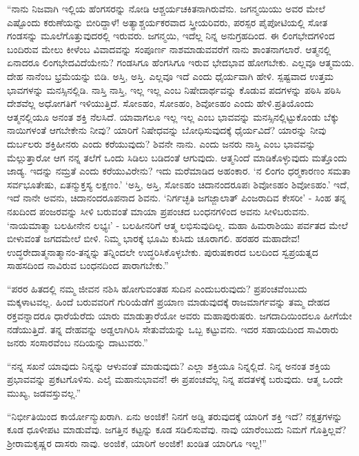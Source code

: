  “ನಾನು ನಿಜವಾಗಿ ಇಲ್ಲಿಯ ಹೆಂಗಸರನ್ನು ನೋಡಿ ಆಶ್ಚರ್ಯಚಕಿತನಾಗಿರುವೆನು. ಜಗನ್ಮಯಿಯು ಅವರ ಮೇಲೆ ಎಷ್ಟೊಂದು ಕರುಣೆಯನ್ನು ಬೀರಿದ್ದಾಳೆ! ಅತ್ಯಾಶ್ಚರ್ಯಕರವಾದ ಸ್ತ್ರೀಯರಿವರು, ಪರಸ್ಪರ ಪೈಪೋಟಿಯಲ್ಲಿ ಸೋತ ಗಂಡಸನ್ನು ಮೂಲೆಗೊತ್ತುವುದರಲ್ಲಿ ಇರುವರು. ಜಗನ್ಮಯಿ, ಇದೆಲ್ಲ ನಿನ್ನ ಅನುಗ್ರಹದಿಂದ. ಈ ಲಿಂಗಭೇದಗಳಿಂದ ಬಂದಿರುವ ಮೇಲು ಕೀಳೆಂಬ ವಿವಾದವನ್ನು ಸಂಪೂರ್ಣ ನಾಶಮಾಡುವವರೆಗೆ ನಾನು ಶಾಂತನಾಗಲಾರೆ. ಆತ್ಮನಲ್ಲಿ ಏನಾದರೂ‌ ಲಿಂಗಭೇದವಿದೆಯೇನು? ಗಂಡಸಿಗೂ ಹೆಂಗಸಿಗೂ ಇರುವ ಭೇದಭಾವ ಹೋಗಬೇಕು. ಎಲ್ಲವೂ ಆತ್ಮಮಯ. ದೇಹ ನಾನೆಂಬ ಭ್ರಮೆಯನ್ನು ಬಿಡಿ. ಅಸ್ತಿ, ಅಸ್ತಿ. ಎಲ್ಲವೂ ಇದೆ ಎಂದು ಧೈರ್ಯವಾಗಿ ಹೇಳಿ. ಸ್ಪಷ್ಟವಾದ ಉತ್ತಮ ಭಾವಗಳನ್ನು ಮನಸ್ಸಿನಲ್ಲಿಡಿ. ನಾಸ್ತಿ ನಾಸ್ತಿ, ಇಲ್ಲ ಇಲ್ಲ ಎಂಬ ನಿಷೇದಾರ್ಥವನ್ನು ಕೊಡುವ ಪದಗಳನ್ನು ಪಠಿಸಿ ಪಠಿಸಿ ದೇಶವೆಲ್ಲ ಅಧೋಗತಿಗೆ ಇಳಿಯುತ್ತಿದೆ. ಸೋಽಹಂ, ಸೋಽಹಂ, ಶಿವೋಽಹಂ ಎಂದು ಹೇಳಿ.\break ಪ್ರತಿಯೊಂದು ಆತ್ಮನಲ್ಲಿಯೂ ಅನಂತ ಶಕ್ತಿ ನೆಲಸಿದೆ. ಯಾವಾಗಲೂ ಇಲ್ಲ ಇಲ್ಲ ಎಂಬ ಭಾವವನ್ನು ಮನಸ್ಸಿನಲ್ಲಿಟ್ಟುಕೊಂಡು ಬೆಕ್ಕು ನಾಯಿಗಳಂತೆ ಆಗಬೇಕೇನು ನೀವು? ಯಾರಿಗೆ ನಿಷೇಧವನ್ನು ಬೋಧಿಸುವುದಕ್ಕೆ ಧೈರ್ಯವಿದೆ? ಯಾರನ್ನು ನೀವು ದುರ್ಬಲರು ಶಕ್ತಿಹೀನರು ಎಂದು ಕರೆಯುವುದು? ಶಿವನೇ ನಾನು. ಎಂದು ಜನರು ನಾಸ್ತಿ ಎಂಬ ಭಾವವನ್ನು ಮೆಲ್ಲುತ್ತಾರೋ ಆಗ ನನ್ನ ತಲೆಗೆ ಒಂದು ಸಿಡಿಲು ಬಡಿದಂತೆ ಆಗುವುದು. ಆತ್ಮನಿಂದೆ ಮಾಡಿಕೊಳ್ಳುವುದು ಮತ್ತೊಂದು ಜಾಡ್ಯ. ಇದನ್ನು ನಮ್ರತೆ ಎಂದು ಕರೆಯುವಿರೇನು? ಇದು ಮರೆಮಾಡಿದ ಅಹಂಕಾರ. ‘ನ ಲಿಂಗಂ ಧರ‍್ಮಕಾರಣಂ ಸಮತಾ ಸರ್ವಭೂತೇಷು, ಏತನ್ಮುಕ್ತಸ್ಯ ಲಕ್ಷಣಂ.’ ‘ಅಸ್ತಿ, ಅಸ್ತಿ, ಸೋಽಹಂ ಚಿದಾನಂದರೂಪಃ ಶಿವೋಽಹಂ ಶಿವೋಽಹಂ.’ ಇದೆ, ಇದೆ ನಾನೇ ಅವನು, ಚಿದಾನಂದರೂಪನಾದ ಶಿವನು. ‘ನಿರ್ಗಚ್ಛತಿ ಜಗಜ್ಜಾಲಾತ್ ಪಿಂಜರಾದಿವ ಕೇಸರೀ' - ಸಿಂಹ ತನ್ನ ನಖದಿಂದ ಪಂಜರವನ್ನು ಸೀಳಿ ಬರುವಂತೆ ಮಾಯಾ ಪ್ರಪಂಚದ ಬಂಧನಗಳಿಂದ ಅವನು ಸೀಳಿಬರುವನು. ‘ನಾಯಮಾತ್ಮಾ ಬಲಹೀನೇನ ಲಭ್ಯಃ’ - ಬಲಹೀನರಿಗೆ ಆತ್ಮ ಲಭಿಸುವುದಿಲ್ಲ. ಮಹಾ ಹಿಮರಾಶಿಯು ಪರ್ವತದ ಮೇಲೆ ಬೀಳುವಂತೆ ಜಗದಮೇಲೆ ಬೀಳಿ. ನಿಮ್ಮ ಭಾರಕ್ಕೆ ಭೂಮಿ ಕುಸಿದು ಚೂರಾಗಲಿ. ಹರಹರ ಮಹಾದೇವ! ಉದ್ಧರೇದಾತ್ಮನಾತ್ಮಾನಂ-ತನ್ನನ್ನು ತನ್ನಿಂದಲೇ ಉದ್ಧರಿಸಿಕೊಳ್ಳಬೇಕು. ಪುರುಷಕಾರದ ಬಲದಿಂದ ಸ್ವಪ್ರಯತ್ನದ ಸಾಹಸದಿಂದ ನಾವಿರುವ ಬಂಧನದಿಂದ ಪಾರಾಗಬೇಕು.” 

 “ಪರರ ಹಿತದಲ್ಲಿ ನಮ್ಮ ಜೀವನ ನಶಿಸಿ ಹೋಗುವಂತಹ ಸುದಿನ ಎಂದು\break ಬರುವುದು? ಪ್ರಪಂಚವೆಂಬುದು ಮಕ್ಕಳಾಟವಲ್ಲ. ಹಿಂದೆ ಬರುವವರಿಗೆ ಗುರಿಯೆಡೆಗೆ ಪ್ರಯಾಣ ಮಾಡುವುದಕ್ಕೆ ರಾಜಮಾರ್ಗವನ್ನು ತಮ್ಮ ದೇಹದ ರಕ್ತವನ್ನಾದರೂ ಧಾರೆಯೆರೆದು ಯಾರು ಮಾಡುತ್ತಾರೆಯೋ ಅವರು ಮಹಾಪುರುಷರು. ಜಗದಾದಿಯಿಂದಲೂ ಹೀಗೆಯೇ ನಡೆಯುತ್ತಿದೆ. ತನ್ನ ದೇಹವನ್ನು ಅಡ್ಡಲಾಗಿರಿಸಿ ಸೇತುವೆಯನ್ನು ಒಬ್ಬ ಕಟ್ಟುವನು. ಇದರ ಸಹಾಯದಿಂದ ಸಾವಿರಾರು ಜನರು ಸಂಸಾರವೆಂಬ ನದಿಯನ್ನು ದಾಟುವರು.” 

 “ನನ್ನ ಸಖನೆ ಯಾವುದು ನಿನ್ನನ್ನು ಆಳುವಂತೆ ಮಾಡುವುದು? ಎಲ್ಲಾ ಶಕ್ತಿಯೂ ನಿನ್ನಲ್ಲಿದೆ. ನಿನ್ನ ಅನಂತ ಶಕ್ತಿಯ ಪ್ರಭಾವವನ್ನು ಪ್ರಕಟಗೊಳಿಸು. ಎಲೈ ಮಹಾನುಭಾವನೆ! ಈ ಪ್ರಪಂಚವೆಲ್ಲ ನಿನ್ನ ಪದತಳಕ್ಕೆ ಬರುವುದು. ಆತ್ಮ ಒಂದೇ ಮುಖ್ಯ, ಜಡವಸ್ತುವಲ್ಲ.” 

 “ನಿರ್ಭೀತಿಯಿಂದ ಕಾರ್ಯೋನ್ಮುಖರಾಗಿ. ಏನು ಅಂಜಿಕೆ! ನಿನಗೆ ಅಡ್ಡಿ ತರುವುದಕ್ಕೆ ಯಾರಿಗೆ ಶಕ್ತಿ ಇದೆ? ನಕ್ಷತ್ರಗಳನ್ನು ಕೂಡ ಧೂಳೀಪಟ ಮಾಡುವೆವು. ಜಗತ್ತಿನ ಕಟ್ಟನ್ನು ಕೂಡ ಸಡಿಲಿಸುವೆವು. ನಾವು ಯಾರೆಂಬುದು ನಿಮಗೆ ಗೊತ್ತಿಲ್ಲವೆ? ಶ‍್ರೀರಾಮಕೃಷ್ಣರ ದಾಸರು ನಾವು. ಅಂಜಿಕೆ, ಯಾರಿಗೆ ಅಂಜಿಕೆ! ಖಂಡಿತ ಯಾರಿಗೂ ಇಲ್ಲ!” 

